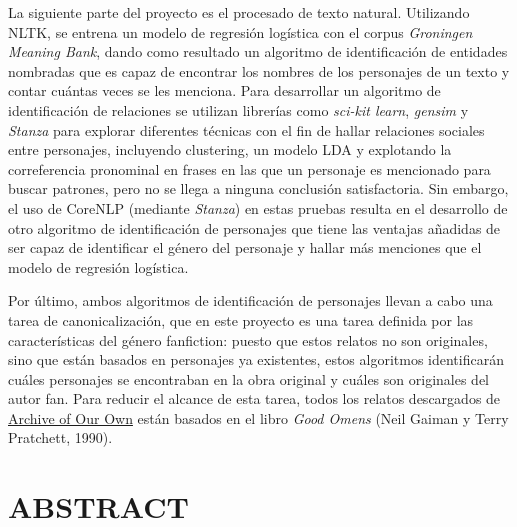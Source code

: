 \documentclass{pre-tfg}
\begin{document}
La siguiente parte del proyecto es el procesado de texto natural. Utilizando NLTK, se entrena un modelo de regresión logística con el corpus \textit{Groningen Meaning Bank}, dando como resultado un algoritmo de identificación de entidades nombradas que es capaz de encontrar los nombres de los personajes de un texto y contar cuántas veces se les menciona. Para desarrollar un algoritmo de identificación de relaciones se utilizan librerías como \textit{sci-kit learn}, \textit{gensim} y \textit{Stanza} para explorar diferentes técnicas con el fin de hallar relaciones sociales entre personajes, incluyendo clustering, un modelo LDA y explotando la correferencia pronominal en frases en las que un personaje es mencionado para buscar patrones, pero no se llega a ninguna conclusión satisfactoria. Sin embargo, el uso de CoreNLP (mediante \textit{Stanza}) en estas pruebas resulta en el desarrollo de otro algoritmo de identificación de personajes que tiene las ventajas añadidas de ser capaz de identificar el género del personaje y hallar más menciones que el modelo de regresión logística. 

Por último, ambos algoritmos de identificación de personajes llevan a cabo una tarea de canonicalización, que en este proyecto es una tarea definida por las características del género fanfiction: puesto que estos relatos no son originales, sino que están basados en personajes ya existentes, estos algoritmos identificarán cuáles personajes se encontraban en la obra original y cuáles son originales del autor fan. Para reducir el alcance de esta tarea, todos los relatos descargados de  \href{http://www.archiveofourown.org}{Archive of Our Own} están basados en el libro \textit{Good Omens} (Neil Gaiman y Terry Pratchett, 1990).


\cleardoublepage

\section{ABSTRACT}

\begin{comment}
Information extraction is the task of recognizing the entities present in a text, and which relationships exist between them. This project attemps an application of this task on literary works, in particular to those belonging the genre of fanfiction. A classifier trained with a logistic regression model, in combination with information provided by CoreNLP, is proposed as a method for recognizing characters in a text. A series of scrapers and tools created in python for extracting and handling HTML files from \href{http://www.archiveofourown.org}{Archive of Our Own} were also created in order to provide the necessary data for the project. Some strategies for recognition of social relationships between characters are explored, unsuccessfully.
\end{comment}
\end{document}
